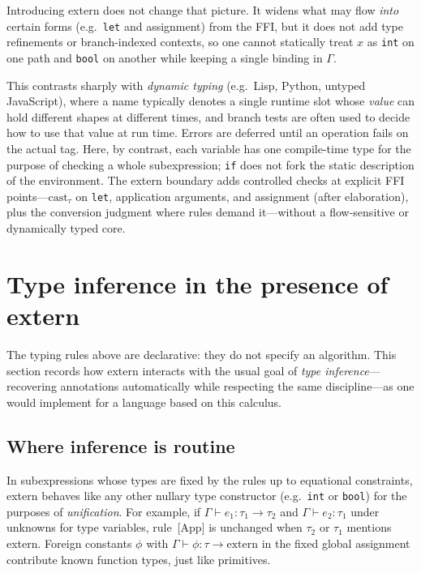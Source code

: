 \documentclass[11pt,a4paper]{article}
\begin{document}
Introducing \textsf{extern} does not change that picture.
It widens what may flow \emph{into} certain forms (e.g.\ \texttt{let} and assignment) from the FFI, but it does not add type refinements or branch-indexed contexts, so one cannot statically treat $x$ as \texttt{int} on one path and \texttt{bool} on another while keeping a single binding in $\Gamma$.

This contrasts sharply with \emph{dynamic typing} (e.g.\ Lisp, Python, untyped JavaScript), where a name typically denotes a single runtime slot whose \emph{value} can hold different shapes at different times, and branch tests are often used to decide how to use that value at run time.
Errors are deferred until an operation fails on the actual tag.
Here, by contrast, each variable has one compile-time type for the purpose of checking a whole subexpression; \texttt{if} does not fork the static description of the environment.
The \textsf{extern} boundary adds controlled checks at explicit FFI points---$\text{cast}_{\tau}$ on \texttt{let}, application arguments, and assignment (after elaboration), plus the conversion judgment where rules demand it---without a flow-sensitive or dynamically typed core.

\section{Type inference in the presence of \textsf{extern}}

The typing rules above are declarative: they do not specify an algorithm.
This section records how \textsf{extern} interacts with the usual goal of \emph{type inference}---recovering annotations automatically while respecting the same discipline---as one would implement for a language based on this calculus.

\subsection{Where inference is routine}

In subexpressions whose types are fixed by the rules up to equational constraints, \textsf{extern} behaves like any other nullary type constructor (e.g.\ \texttt{int} or \texttt{bool}) for the purposes of \emph{unification}.
For example, if $\Gamma \vdash e_1 : \tau_1 \to \tau_2$ and $\Gamma \vdash e_2 : \tau_1$ under unknowns for type variables, rule~\textsf{[App]} is unchanged when $\tau_2$ or $\tau_1$ mentions \textsf{extern}.
Foreign constants $\phi$ with $\Gamma \vdash \phi : \tau \to \text{extern}$ in the fixed global assignment contribute known function types, just like primitives.
\end{document}
